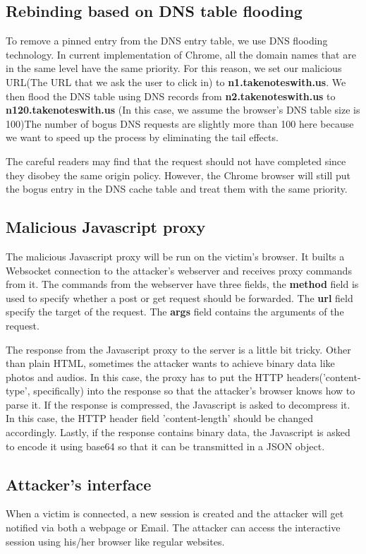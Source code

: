 \subsection{Rebinding based on DNS table flooding}
To remove a pinned entry from the DNS entry table, we use DNS flooding technology. In current implementation of Chrome, all the domain names that are in the same level have the same priority. For this reason, we set our malicious URL(The URL that we ask the user to click in) to \textbf{n1.takenoteswith.us}.
We then flood the DNS table using DNS records from \textbf{n2.takenoteswith.us} to \textbf{n120.takenoteswith.us} (In this case, we assume the browser's DNS table size is 100)The number of bogus DNS requests are slightly more than 100 here because we want to speed up the process by eliminating the tail effects.

The careful readers may find that the request should not have completed since they disobey the same origin policy. However, the Chrome browser will still put the bogus entry in the DNS cache table and treat them with the same priority. 

\subsection{Malicious Javascript proxy}
The malicious Javascript proxy will be run on the victim's browser. It builts a Websocket connection to the attacker's webserver and receives proxy commands from it. The commands from the webserver have three fields, the \textbf{method} field is used to specify whether a post or get request should be forwarded. The \textbf{url} field specify the target of the request. The \textbf{args} field contains the arguments of the request.

The response from the Javascript proxy to the server is a little bit tricky. Other than plain HTML, sometimes the attacker wants to achieve binary data like photos and audios. In this case, the proxy has to put the HTTP headers('content-type', specifically) into the response so that the attacker's browser knows how to parse it. If the response is compressed, the Javascript is asked to decompress it. In this case, the HTTP header field 'content-length' should be changed accordingly. Lastly, if the response contains binary data, the Javascript is asked to encode it using base64 so that it can be transmitted in a JSON object. 

\subsection{Attacker's interface}
When a victim is connected, a new session is created and the attacker will get notified via both a webpage or Email. The attacker can access the interactive session using his/her browser like regular websites. 

